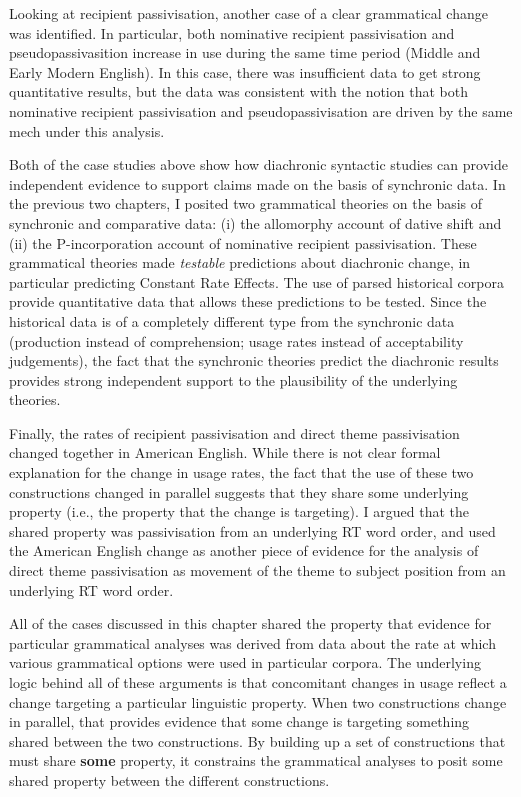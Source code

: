 	Looking at recipient passivisation, another case of a clear grammatical change was identified. In particular, both nominative recipient passivisation and pseudopassivasition increase in use during the same time period (Middle and Early Modern English). In this case, there was insufficient data to get strong quantitative results, but the data was consistent with the notion that both nominative recipient passivisation and pseudopassivisation are driven by the same mech under this analysis.

	Both of the case studies above show how diachronic syntactic studies can provide independent evidence to support claims made on the basis of synchronic data. In the previous two chapters, I posited two grammatical theories on the basis of synchronic and comparative data: (i) the allomorphy account of dative shift and (ii) the P-incorporation account of nominative recipient passivisation. These grammatical theories made \textit{testable} predictions about diachronic change, in particular predicting Constant Rate Effects. The use of parsed historical corpora provide quantitative data that allows these predictions to be tested. Since the historical data is of a completely different type from the synchronic data (production instead of comprehension; usage rates instead of acceptability judgements), the fact that the synchronic theories predict the diachronic results provides strong independent support to the plausibility of the underlying theories.

	Finally, the rates of recipient passivisation and direct theme passivisation changed together in American English. While there is not clear formal explanation for the change in usage rates, the fact that the use of these two constructions changed in parallel suggests that they share some underlying property (i.e., the property that the change is targeting). I argued that the shared property was passivisation from an underlying RT word order, and used the American English change as another piece of evidence for the analysis of direct theme passivisation as movement of the theme to subject position from an underlying RT word order.

	All of the cases discussed in this chapter shared the property that evidence for particular grammatical analyses was derived from data about the rate at which various grammatical options were used in particular corpora. The underlying logic behind all of these arguments is that concomitant changes in usage reflect a change targeting a particular linguistic property. When two constructions change in parallel, that provides evidence that some change is targeting something shared between the two constructions. By building up a set of constructions that must share \textbf{some} property, it constrains the grammatical analyses to posit some shared property between the different constructions.

%
